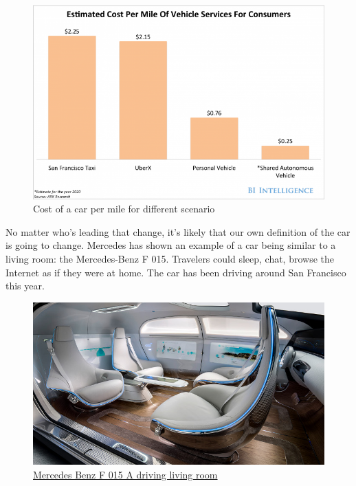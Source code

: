 \documentclass[12pt]{article}
\begin{document}
\medskip

\begin{figure}[ht]
    \centering
    \includegraphics[width=\linewidth]{vehicle-cost}
    \caption{Cost of a car per mile for different scenario}
    \label{fig:cost_of_car}
\end{figure}

\smallskip

No matter who's leading that change, it's likely that our own definition of the
car is going to change. Mercedes has shown an example of a car being similar to
a living room: the Mercedes-Benz F 015. Travelers could sleep, chat, browse the
Internet as if they were at home. The car has been driving around San Francisco
this year.

\smallskip
\begin{figure}[ht]
    \centering
    \includegraphics[width=\linewidth]{mercedes}
    \caption{\href{http://www.entrepreneur.com/article/243751}
    {Mercedes Benz F 015 A driving living room}}
    \label{fig:mercedesBenz}
\end{figure}
\end{document}
